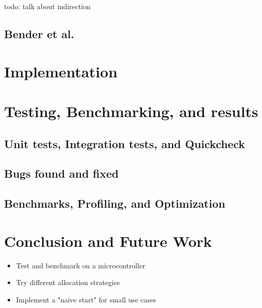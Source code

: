 \documentclass[12pt]{article}
\begin{document}
todo: talk about indirection

\subsection{Bender et al. \cite{10.5555/647912.740822}}


\newpage
\section{Implementation}

\newpage
\section{Testing, Benchmarking, and results}

\subsection{Unit tests, Integration tests, and Quickcheck}

\subsection{Bugs found and fixed}

\subsection{Benchmarks, Profiling, and Optimization}


\newpage
\section{Conclusion and Future Work}

\begin{itemize}
	\item Test and benchmark on a microcontroller
	\item Try different allocation strategies
	\item Implement a "naive start" for small use cases
\end{itemize}

\newpage
\printbibliography
\end{document}

